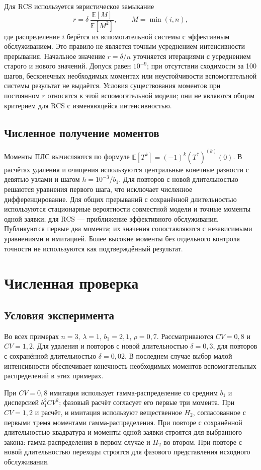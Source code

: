 Для RCS используется эвристическое замыкание
\[
r=\delta\,\frac{\mathbb E[M]}{\mathbb E[M^2]},\qquad M=\min(i,n),
\]
где распределение \(i\) берётся из вспомогательной системы с эффективным обслуживанием. Это правило не является точным усреднением интенсивности прерывания. Начальное значение \(r=\delta/n\) уточняется итерациями с усреднением старого и нового значений. Допуск равен \(10^{-9}\); при отсутствии сходимости за 100 шагов, бесконечных необходимых моментах или неустойчивости вспомогательной системы результат не выдаётся. Условия существования моментов при постоянном \(r\) относятся к этой вспомогательной модели; они не являются общим критерием для RCS с изменяющейся интенсивностью.

\subsection{Численное получение моментов}
Моменты ПЛС вычисляются по формуле \(\mathbb E[T^k]=(-1)^k(T^*)^{(k)}(0)\). В расчётах удаления и очищения используются центральные конечные разности с девятью узлами и шагом \(h=10^{-3}/b_1\). Для повторов с новой длительностью решаются уравнения первого шага, что исключает численное дифференцирование. Для общих прерываний с сохранённой длительностью используются стационарные вероятности совместной модели и точные моменты одной заявки; для RCS --- приближение эффективного обслуживания. Публикуются первые два момента; их значения сопоставляются с независимыми уравнениями и имитацией. Более высокие моменты без отдельного контроля точности не используются как подтверждённый результат.

\section{Численная проверка}\label{sec:results}
\subsection{Условия эксперимента}
Во всех примерах \(n=3\), \(\lambda=1\), \(b_1=2{,}1\), \(\rho=0{,}7\). Рассматриваются \(CV=0{,}8\) и \(CV=1{,}2\). Для удаления и повторов с новой длительностью \(\delta=0{,}3\), для повторов с сохранённой длительностью \(\delta=0{,}02\). В последнем случае выбор малой интенсивности обеспечивает конечность необходимых моментов вспомогательных распределений в этих примерах.

При \(CV=0{,}8\) имитация использует гамма-распределение со средним \(b_1\) и дисперсией \(b_1^2CV^2\); фазовый расчёт согласует его первые три момента. При \(CV=1{,}2\) и расчёт, и имитация используют вещественное \(H_2\), согласованное с первыми тремя моментами гамма-распределения. При повторе с сохранённой длительностью квадратура и моменты одной заявки строятся для выбранного закона: гамма-распределения в первом случае и \(H_2\) во втором. При повторе с новой длительностью переходы строятся для фазового представления исходного обслуживания.


